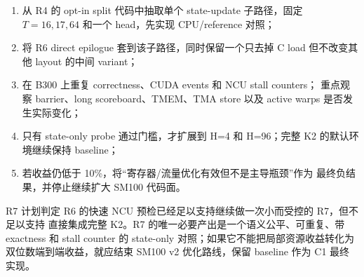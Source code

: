 \begin{enumerate}
\item 从 R4 的 opt-in split 代码中抽取单个 state-update 子路径，固定
      \(T=16,17,64\) 和一个 head，先实现 CPU/reference 对照；
\item 将 R6 direct epilogue 套到该子路径，同时保留一个只去掉 C load
      但不改变其他 layout 的中间 variant；
\item 在 B300 上重复 correctness、CUDA events 和 NCU stall counters；
      重点观察 barrier、long scoreboard、TMEM、TMA store 以及
      active warps 是否发生实际变化；
\item 只有 state-only probe 通过门槛，才扩展到 H=4 和 H=96；完整 K2
      的默认环境继续保持 baseline；
\item 若收益仍低于 10\%，将“寄存器/流量优化有效但不是主导瓶颈”作为
      最终负结果，并停止继续扩大 SM100 代码面。
\end{enumerate}

\begin{record}{R7 计划判定}
R6 的快速 NCU 预检已经足以支持继续做一次小而受控的 R7，但不足以支持
直接集成完整 K2。R7 的唯一必要产出是一个语义公平、可重复、带 exactness
和 stall counter 的 state-only 对照；如果它不能把局部资源收益转化为
双位数端到端收益，就应结束 SM100 v2 优化路线，保留 baseline 作为 C1
最终实现。
\end{record}
